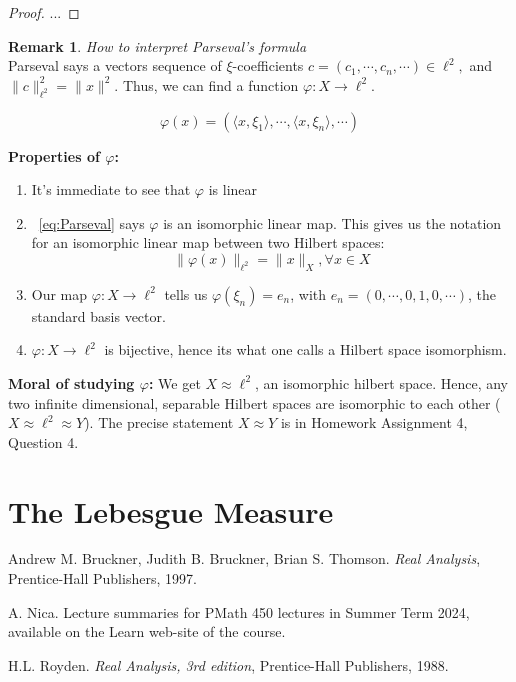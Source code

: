 \documentclass[11pt]{amsart}
\theoremstyle{definition}
\newtheorem{remark}[theorem]{Remark}
\numberwithin{equation}{section}
\begin{document}
\begin{proof}
...
\end{proof}

\begin{remark}\label{rem:57} \textit{How to interpret Parseval's formula}\\
Parseval says a vectors sequence of $\xi$-coefficients $c = (c_1, \cdots, c_n, \cdots) \in \ell^2,$ and $\|c\|^2_{\ell^2} = \|x\|^2$. Thus, we can find a function $\varphi: X\rightarrow \ell^2$. 

\[ \tag{$\ell^2$-iso} \varphi(x) = (\langle x, \xi_1 \rangle, \cdots, \langle x, \xi_n \rangle, \cdots)	\]
\end{remark}

\textbf{Properties of $\varphi$:} \begin{enumerate}
\item It's immediate to see that $\varphi$ is linear
\item ~\ref{eq:Parseval} says $\varphi$ is an isomorphic linear map. This gives us the notation for an isomorphic linear map between two Hilbert spaces:
\[ \| \varphi(x)\|_{\ell^2} = \|x\|_X, \forall x \in X \]
\item Our map $\varphi:X \rightarrow \ell^2$ tells us $\varphi(\xi_n) = e_n$, with $e_n = (0, \cdots, 0,1,0,\cdots)$, the standard basis vector. 
\item $\varphi:X \rightarrow \ell^2$ is bijective, hence its what one calls a Hilbert space isomorphism. \\
\end{enumerate}

\noindent \textbf{Moral of studying $\varphi$:} We get $X \approx \ell^2$, an isomorphic hilbert space. Hence, any two infinite dimensional, separable Hilbert spaces are isomorphic to each other ($X \approx \ell^2 \approx Y$). The precise statement $X \approx Y$ is in Homework Assignment 4, Question 4. \\


\part{The Lebesgue Measure}


\newpage
\begin{thebibliography}{99}

Andrew M. Bruckner, Judith B. Bruckner, Brian S. Thomson.
{\em Real Analysis}, Prentice-Hall Publishers, 1997.

\vspace{4pt}

 A. Nica.
Lecture summaries for PMath 450 lectures in Summer Term 2024,
available on the Learn web-site of the course.

\vspace{4pt}

 H.L. Royden. {\em Real Analysis, 3rd edition}, Prentice-Hall Publishers, 1988.
\end{thebibliography}
\end{document}
